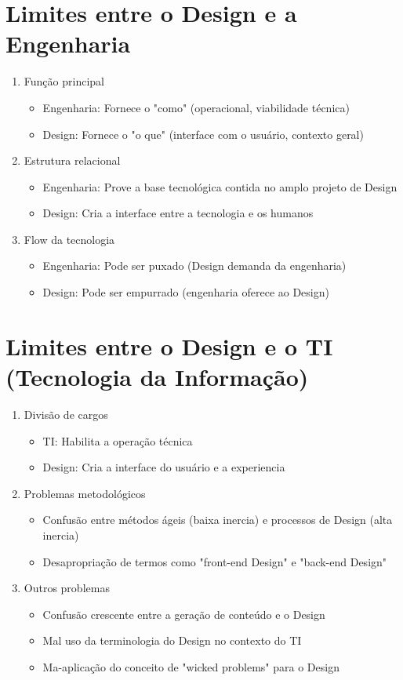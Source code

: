\documentclass{article}
\begin{document}
\section{Limites entre o Design e a Engenharia}
\begin{enumerate}
    \item Função principal
    \begin{itemize}
        \item Engenharia: Fornece o "como" (operacional, viabilidade técnica)
        \item Design: Fornece o "o que" (interface com o usuário, contexto geral)
    \end{itemize}
    \item Estrutura relacional
    \begin{itemize}
        \item Engenharia: Prove a base tecnológica contida no amplo projeto de Design
        \item Design: Cria a interface entre a tecnologia e os humanos
    \end{itemize}
    \item Flow da tecnologia
    \begin{itemize}
        \item Engenharia: Pode ser puxado (Design demanda da engenharia)
        \item Design: Pode ser empurrado (engenharia oferece ao Design)
    \end{itemize}
\end{enumerate}
\newpage
\section{Limites entre o Design e o TI (Tecnologia da Informação)}
\begin{enumerate}
    \item Divisão de cargos
    \begin{itemize}
        \item TI: Habilita a operação técnica
        \item Design: Cria a interface do usuário e a experiencia
    \end{itemize}
    \item Problemas metodológicos
    \begin{itemize}
        \item Confusão entre métodos ágeis (baixa inercia) e processos de Design (alta inercia)
        \item Desapropriação de termos como "front-end Design" e "back-end Design"
    \end{itemize}
    \item Outros problemas
    \begin{itemize}
        \item Confusão crescente entre a geração de conteúdo e o Design
        \item Mal uso da terminologia do Design no contexto do TI
        \item Ma-aplicação do conceito de "wicked problems" para o Design
    \end{itemize}
\end{enumerate}
\newpage
\end{document}
